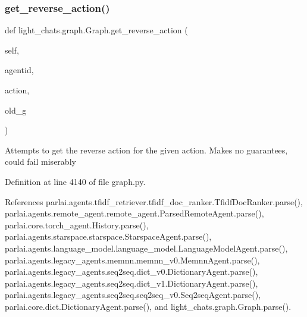 \subsubsection{\texorpdfstring{get\+\_\+reverse\+\_\+action()}{get\_reverse\_action()}}
{\footnotesize\ttfamily def light\+\_\+chats.\+graph.\+Graph.\+get\+\_\+reverse\+\_\+action (\begin{DoxyParamCaption}\item[{}]{self,  }\item[{}]{agentid,  }\item[{}]{action,  }\item[{}]{old\+\_\+g }\end{DoxyParamCaption})}

\begin{DoxyVerb}Attempts to get the reverse action for the given action. Makes no
guarantees, could fail miserably\end{DoxyVerb}
 

Definition at line 4140 of file graph.\+py.



References parlai.\+agents.\+tfidf\+\_\+retriever.\+tfidf\+\_\+doc\+\_\+ranker.\+Tfidf\+Doc\+Ranker.\+parse(), parlai.\+agents.\+remote\+\_\+agent.\+remote\+\_\+agent.\+Parsed\+Remote\+Agent.\+parse(), parlai.\+core.\+torch\+\_\+agent.\+History.\+parse(), parlai.\+agents.\+starspace.\+starspace.\+Starspace\+Agent.\+parse(), parlai.\+agents.\+language\+\_\+model.\+language\+\_\+model.\+Language\+Model\+Agent.\+parse(), parlai.\+agents.\+legacy\+\_\+agents.\+memnn.\+memnn\+\_\+v0.\+Memnn\+Agent.\+parse(), parlai.\+agents.\+legacy\+\_\+agents.\+seq2seq.\+dict\+\_\+v0.\+Dictionary\+Agent.\+parse(), parlai.\+agents.\+legacy\+\_\+agents.\+seq2seq.\+dict\+\_\+v1.\+Dictionary\+Agent.\+parse(), parlai.\+agents.\+legacy\+\_\+agents.\+seq2seq.\+seq2seq\+\_\+v0.\+Seq2seq\+Agent.\+parse(), parlai.\+core.\+dict.\+Dictionary\+Agent.\+parse(), and light\+\_\+chats.\+graph.\+Graph.\+parse().

